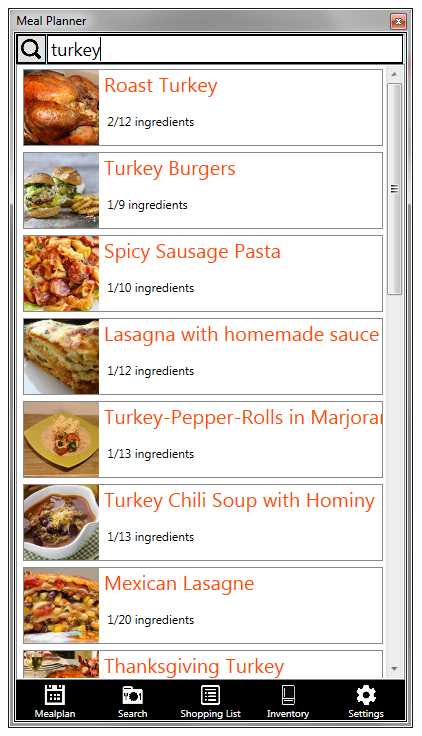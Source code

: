 \begin{figure}[H]
\begin{minipage}{.33\textwidth}
  \includegraphics[width=.9\linewidth]{Grafik/SearchPage}
  \label{fig:SearchPage}
\end{minipage}%
\begin{minipage}{.33\textwidth}
  \centering

\end{minipage}
\end{figure}
